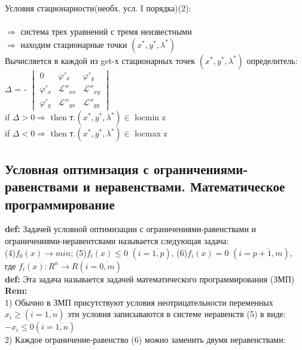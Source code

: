 Условия стационарности(необх. усл. I порядка)(2): \\
  \\ 
$\Rightarrow$ система трех уравнений с тремя неизвестными \\ $\Rightarrow$ находим стационарные точки $(x^*,y^*,\lambda^*)$ \\

\noindent Вычисляется в каждой из get-х стационарных точек $(x^*,y^*,\lambda^*)$ определитель:\\

$\Delta$ = - 
$\begin{vmatrix}
0&\varphi'_x&\varphi'_y \\
\varphi'_x& \mathcal{L}''_{xx}&\mathcal{L}''_{xy} \\
\varphi'_y& \mathcal{L}''_{yx}&\mathcal{L}''_{yy}
\end{vmatrix}$ \\

\noindent if $\Delta > 0 \Rightarrow$ then т.$(x^*,y^*,\lambda^*) \in$ locmin z \\
if $\Delta < 0 \Rightarrow$ then т.$(x^*,y^*,\lambda^*) \in$ locmax z

\subsection{Условная оптимизация с ограничениями-равенствами и неравенствами. Математическое программирование}
\textbf{def:} Задачей условной оптимизации с ограничениями-равенствами и ограничениями-неравентсвами называется следующая задача: \\
(4)$f_0(x) \rightarrow min$; (5)$f_i(x) \leq 0$ $(i = \overline{1,p})$, (6)$f_i(x) = 0$ $(i = \overline{p+1,m})$, \\ 
где $f_i(x): R^n \rightarrow R (i = \overline{0,m})$ \\

\noindent \textbf{def:} Эта задача называется задачей математического программирования (ЗМП) \\
\noindent \textbf{Rem:} \\
1) Обычно в ЗМП присутствуют условия неотрицательности переменных $x_i \geq (i = \overline{1,n})$ эти условия записываются в системе неравенств (5) в виде: $-x_i \leq 0 (i = \overline{1,n})$ \\
2) Каждое ограничение-равенство (6) можно заменить двумя неравенствами: \\

